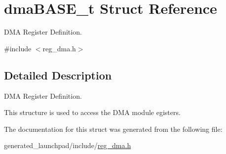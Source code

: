 \hypertarget{structdmaBASE__t}{}\section{dma\+B\+A\+S\+E\+\_\+t Struct Reference}
\label{structdmaBASE__t}


D\+MA Register Definition.  




{\ttfamily \#include $<$reg\+\_\+dma.\+h$>$}



\subsection{Detailed Description}
D\+MA Register Definition. 

This structure is used to access the D\+MA module egisters. 

The documentation for this struct was generated from the following file\+:\begin{DoxyCompactItemize}
\item 
generated\+\_\+launchpad/include/\mbox{\hyperlink{reg__dma_8h}{reg\+\_\+dma.\+h}}\end{DoxyCompactItemize}
